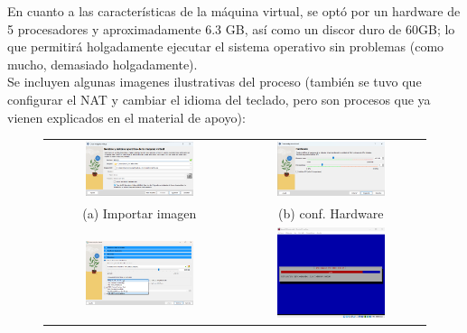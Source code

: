\documentclass{article}
\begin{document}
En cuanto a las características de la máquina virtual, se optó por un hardware de 5 procesadores y aproximadamente 6.3 GB, así como un  discor duro de 60GB; lo que permitirá holgadamente ejecutar el sistema operativo sin problemas (como mucho, demasiado holgadamente).
\\
Se incluyen algunas imagenes ilustrativas del proceso (también se tuvo que configurar el NAT y cambiar el idioma del teclado, pero son procesos que ya vienen explicados en el material de apoyo):
\begin{center}
    \begin{figure}[H]
        \centering
        \begin{tabular}{c c}  %
        \includegraphics[width=0.6\textwidth]{instalacion_maq_1.png} & 
        \includegraphics[width=0.6\textwidth]{instalacion_maq_2.png} \\
        (a) Importar imagen & (b) conf. Hardware \\
        \includegraphics[width=0.6\textwidth]{instalacion_maq_3.png} & 
        \includegraphics[width=0.6\textwidth]{instalacion_maq_4.png} \\

\end{tabular}
\end{figure}
\end{center}
\end{document}
